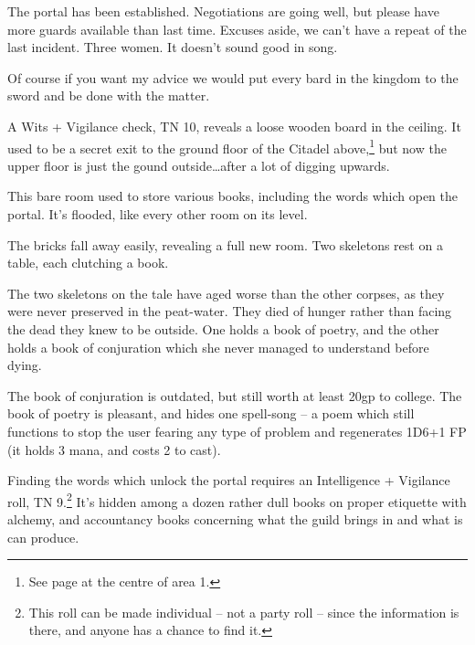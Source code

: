 \begin{multicols}{2}
\begin{exampletext}

	The portal has been established.  Negotiations are going well, but please have more guards available than last time.  Excuses aside, we can't have a repeat of the last incident.  Three women.  It doesn't sound good in song.

	Of course if you want my advice we would put every bard in the kingdom to the sword and be done with the matter.

\end{exampletext}

A Wits + Vigilance check, TN 10, reveals a loose wooden board in the ceiling.
It used to be a secret exit to the ground floor of the Citadel above,\footnote{See page \pageref{lost_citadel} at the centre of area 1.} but now the upper floor is just the gound outside\ldots after a lot of digging upwards.


This bare room used to store various books, including the words which open the portal.  It's flooded, like every other room on its level.

\begin{boxtext}

	The bricks fall away easily, revealing a full new room.  Two skeletons rest on a table, each clutching a book.

\end{boxtext}

The two skeletons on the tale have aged worse than the other corpses, as they were never preserved in the peat-water.  They died of hunger rather than facing the dead they knew to be outside.  One holds a book of poetry, and the other holds a book of conjuration which she never managed to understand before dying.

The book of conjuration is outdated, but still worth at least 20gp to \gls{college}.  The book of poetry is pleasant, and hides one spell-song -- a poem which still functions to stop the user fearing any type of problem and regenerates 1D6+1 FP (it holds 3 mana, and costs 2 to cast).

Finding the words which unlock the portal requires an Intelligence + Vigilance roll, TN 9.\footnote{This roll can be made individual -- not a party roll -- since the information is there, and anyone has a chance to find it.}
It's hidden among a dozen rather dull books on proper etiquette with alchemy, and accountancy books concerning what the guild brings in and what is can produce.


\end{multicols}
